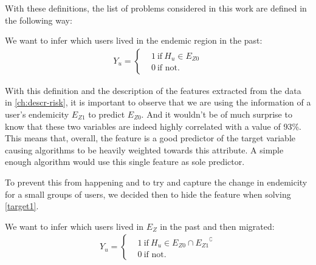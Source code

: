 With these definitions, the list of problems considered in this work are defined in the following way:

\begin{problem}\label{target1}
We want to infer which users lived in the endemic region in the past:
		\begin{align*}
		Y_u =
		\begin{cases}
		&1 \ \mbox{if} \ H_u \in E_{Z0} \\
		&0 \ \mbox{if not}.
		\end{cases}
		\end{align*}
\end{problem}

With this definition and the description of the features extracted from the data in \cref{ch:descr-risk}, it is important to observe that we are using the information of a user's endemicity $E_{Z1}$ to predict $E_{Z0}$.
And it wouldn't be of much surprise to know that these two variables are indeed highly correlated with a value of 93\%. This means that, overall, the feature is a good predictor of the target variable causing algorithms to be heavily weighted towards this attribute. A simple enough algorithm would use this single feature as sole predictor.

To prevent this from happening and to try and capture the change in endemicity for a small groups of users, we decided then to hide the feature when solving \cref{target1}.



\begin{problem}\label{target2}
We want to infer which users lived in $E_Z$ in the past and then migrated:
	\begin{align*}
				Y_u =
				\begin{cases}
					&1 \ \mbox{if} \ H_u \in E_{Z0} \cap { E_{Z1} }^{\complement}  \\
					&0 \ \mbox{if not}.
				\end{cases}
			\end{align*}
\end{problem}

